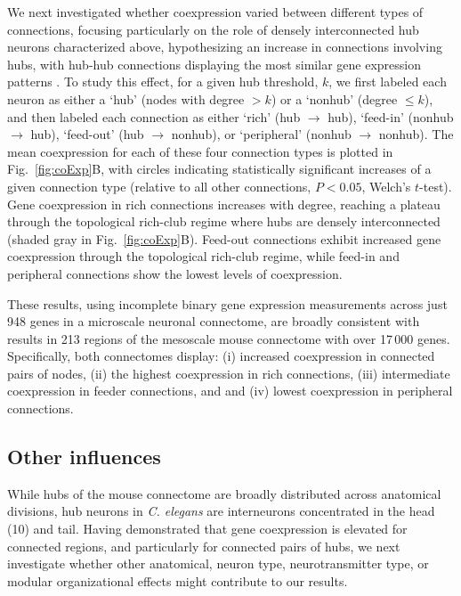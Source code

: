 \documentclass[10pt,letterpaper]{article}
\begin{document}
We next investigated whether coexpression varied between different types of connections, focusing particularly on the role of densely interconnected hub neurons characterized above, hypothesizing an increase in connections involving hubs, with hub-hub connections displaying the most similar gene expression patterns \cite{Fulcher:2016ck}.
To study this effect, for a given hub threshold, $k$, we first labeled each neuron as either a `hub' (nodes with degree $> k$) or a `nonhub' (degree $\leq k$), and then labeled each connection as either `rich' (hub $\rightarrow$ hub), `feed-in' (nonhub $\rightarrow$ hub), `feed-out' (hub $\rightarrow$ nonhub), or `peripheral' (nonhub $\rightarrow$ nonhub).
The mean coexpression for each of these four connection types is plotted in Fig.~\ref{fig:coExp}B, with circles indicating statistically significant increases of a given connection type (relative to all other connections, $P < 0.05$, Welch's $t$-test). 
Gene coexpression in rich connections increases with degree, reaching a plateau through the topological rich-club regime where hubs are densely interconnected (shaded gray in Fig.~\ref{fig:coExp}B).
Feed-out connections exhibit increased gene coexpression through the topological rich-club regime, while feed-in and peripheral connections show the lowest levels of coexpression.

These results, using incomplete binary gene expression measurements across just 948 genes in a microscale neuronal connectome, are broadly consistent with results in 213 regions of the mesoscale mouse connectome with over 17\,000 genes.
Specifically, both connectomes display:
(i) increased coexpression in connected pairs of nodes,
(ii) the highest coexpression in rich connections,
(iii) intermediate coexpression in feeder connections, and
and (iv) lowest coexpression in peripheral connections.

\subsection*{Other influences}
While hubs of the mouse connectome are broadly distributed across anatomical divisions, hub neurons in \emph{C. elegans} are interneurons concentrated in the head (10) and tail.
Having demonstrated that gene coexpression is elevated for connected regions, and particularly for connected pairs of hubs, we next investigate whether other anatomical, neuron type, neurotransmitter type, or modular organizational effects might contribute to our results.
\end{document}
